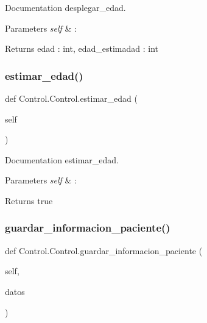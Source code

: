 Documentation desplegar\+\_\+edad. 


\begin{DoxyParams}{Parameters}
{\em self} & \+: \\
\hline
\end{DoxyParams}
\begin{DoxyReturn}{Returns}
edad \+: int, edad\+\_\+estimadad \+: int 
\end{DoxyReturn}
\mbox{\label{class_control_1_1_control_a214b0abae8fa56b8a6e4dae3cd053e7d}} 
\subsubsection{\texorpdfstring{estimar\+\_\+edad()}{estimar\_edad()}}
{\footnotesize\ttfamily def Control.\+Control.\+estimar\+\_\+edad (\begin{DoxyParamCaption}\item[{}]{self }\end{DoxyParamCaption})}



Documentation estimar\+\_\+edad. 


\begin{DoxyParams}{Parameters}
{\em self} & \+: \\
\hline
\end{DoxyParams}
\begin{DoxyReturn}{Returns}
true 
\end{DoxyReturn}
\mbox{\label{class_control_1_1_control_a0690ce69225a0122530a105210b961b8}} 
\subsubsection{\texorpdfstring{guardar\+\_\+informacion\+\_\+paciente()}{guardar\_informacion\_paciente()}}
{\footnotesize\ttfamily def Control.\+Control.\+guardar\+\_\+informacion\+\_\+paciente (\begin{DoxyParamCaption}\item[{}]{self,  }\item[{}]{datos }\end{DoxyParamCaption})}



